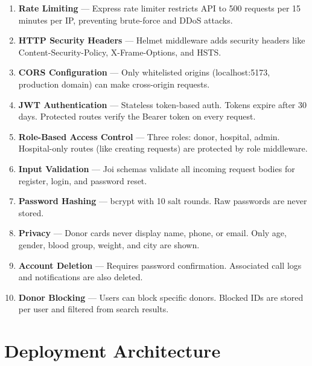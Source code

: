 \documentclass[12pt,a4paper]{article}
\begin{document}
\begin{enumerate}[leftmargin=*]
    \item \textbf{Rate Limiting} --- Express rate limiter restricts API to 500 requests per 15 minutes per IP, preventing brute-force and DDoS attacks.
    \item \textbf{HTTP Security Headers} --- Helmet middleware adds security headers like Content-Security-Policy, X-Frame-Options, and HSTS.
    \item \textbf{CORS Configuration} --- Only whitelisted origins (localhost:5173, production domain) can make cross-origin requests.
    \item \textbf{JWT Authentication} --- Stateless token-based auth. Tokens expire after 30 days. Protected routes verify the Bearer token on every request.
    \item \textbf{Role-Based Access Control} --- Three roles: donor, hospital, admin. Hospital-only routes (like creating requests) are protected by role middleware.
    \item \textbf{Input Validation} --- Joi schemas validate all incoming request bodies for register, login, and password reset.
    \item \textbf{Password Hashing} --- bcrypt with 10 salt rounds. Raw passwords are never stored.
    \item \textbf{Privacy} --- Donor cards never display name, phone, or email. Only age, gender, blood group, weight, and city are shown.
    \item \textbf{Account Deletion} --- Requires password confirmation. Associated call logs and notifications are also deleted.
    \item \textbf{Donor Blocking} --- Users can block specific donors. Blocked IDs are stored per user and filtered from search results.
\end{enumerate}

\section{Deployment Architecture}
\end{document}
